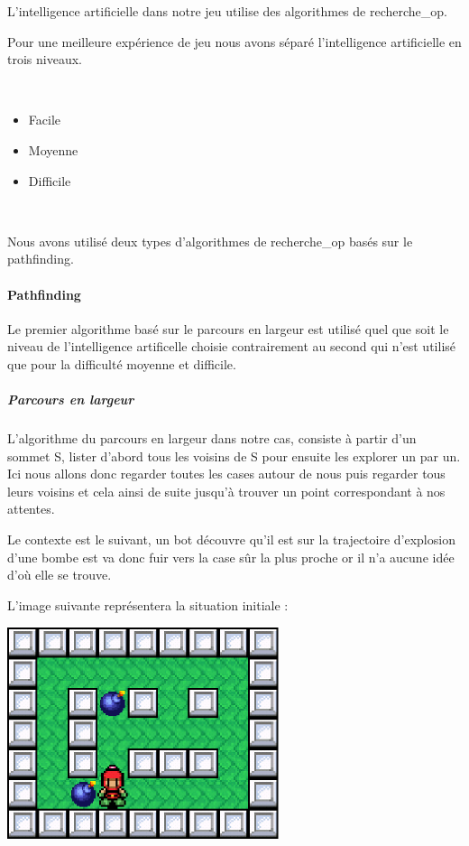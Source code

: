 		L'intelligence artificielle dans notre jeu utilise des algorithmes de \gls{recherche_op}.
		
		Pour une meilleure expérience de jeu nous avons séparé l'intelligence artificielle en trois niveaux.
		
		$\,$
		
		\begin{itemize}
		  \item Facile
		  \item Moyenne
		  \item Difficile
		\end{itemize}
		
		$\,$
		
		Nous avons utilisé deux types d'algorithmes de \gls{recherche_op} basés sur le \gls{pathfinding}.
		
		\paragraph{Pathfinding}
		
			Le premier algorithme basé sur le parcours en largeur est utilisé quel que soit
			le niveau de l'intelligence artificelle choisie contrairement au second qui n'est utilisé
			que pour la difficulté moyenne et difficile.
		
		\subparagraph{Parcours en largeur\\}
		
			L'algorithme du parcours en largeur dans notre cas, consiste à partir d'un sommet S,
			lister d'abord tous les voisins de S pour ensuite les explorer un par un.
			Ici nous allons donc regarder toutes les cases autour de nous puis regarder
			tous leurs voisins et cela ainsi de suite jusqu'à trouver un point
			correspondant à nos attentes.
			
			Le contexte est le suivant, un \gls{bot} découvre qu'il est sur la trajectoire
			d'explosion d'une bombe est va donc fuir vers la case sûr la plus proche or
			il n'a aucune idée d'où elle se trouve.
			
			L'image suivante représentera la situation initiale :
			
			\begin{center}
				\includegraphics[width=8cm]{./Analyse/Img/largeur_0.eps}
			\end{center}
			
